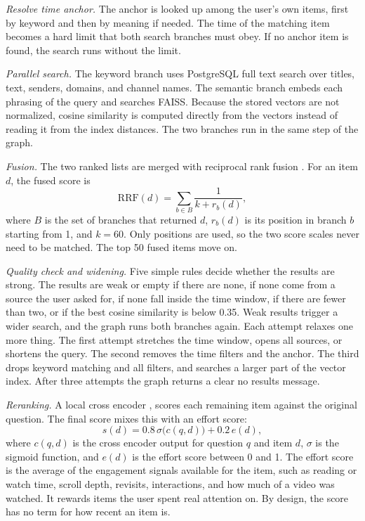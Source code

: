 \documentclass[conference]{IEEEtran}
\begin{document}
\textit{Resolve time anchor.} The anchor is looked up among the user's own items, first by keyword and then by meaning if needed. The time of the matching item becomes a hard limit that both search branches must obey. If no anchor item is found, the search runs without the limit.

\textit{Parallel search.} The keyword branch uses PostgreSQL full text search over titles, text, senders, domains, and channel names. The semantic branch embeds each phrasing of the query and searches FAISS. Because the stored vectors are not normalized, cosine similarity is computed directly from the vectors instead of reading it from the index distances. The two branches run in the same step of the graph.

\textit{Fusion.} The two ranked lists are merged with reciprocal rank fusion \cite{b9}. For an item $d$, the fused score is
\begin{equation}
\mathrm{RRF}(d) = \sum_{b \in B} \frac{1}{k + r_b(d)}, \label{eq:rrf}
\end{equation}
where $B$ is the set of branches that returned $d$, $r_b(d)$ is its position in branch $b$ starting from 1, and $k = 60$. Only positions are used, so the two score scales never need to be matched. The top 50 fused items move on.

\textit{Quality check and widening.} Five simple rules decide whether the results are strong. The results are weak or empty if there are none, if none come from a source the user asked for, if none fall inside the time window, if there are fewer than two, or if the best cosine similarity is below 0.35. Weak results trigger a wider search, and the graph runs both branches again. Each attempt relaxes one more thing. The first attempt stretches the time window, opens all sources, or shortens the query. The second removes the time filters and the anchor. The third drops keyword matching and all filters, and searches a larger part of the vector index. After three attempts the graph returns a clear no results message.

\textit{Reranking.} A local cross encoder \cite{b10}, \cite{b11} scores each remaining item against the original question. The final score mixes this with an effort score:
\begin{equation}
s(d) = 0.8\,\sigma\big(c(q,d)\big) + 0.2\,e(d), \label{eq:final}
\end{equation}
where $c(q,d)$ is the cross encoder output for question $q$ and item $d$, $\sigma$ is the sigmoid function, and $e(d)$ is the effort score between 0 and 1. The effort score is the average of the engagement signals available for the item, such as reading or watch time, scroll depth, revisits, interactions, and how much of a video was watched. It rewards items the user spent real attention on. By design, the score has no term for how recent an item is.
\end{document}
